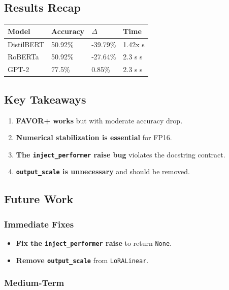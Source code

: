\subsection{Results Recap}

\begin{table}[H]
\centering
\small
\begin{tabular}{llll}
\toprule
\textbf{Model} & \textbf{Accuracy} & \textbf{$\Delta$} & \textbf{Time} \\
\midrule
DistilBERT & 50.92\% & -39.79\% & 1.42x s \\
RoBERTa & 50.92\% & -27.64\% & 2.3 s s \\
GPT-2 & 77.5\% & 0.85\% & 2.3 s s \\
\bottomrule
\end{tabular}
\end{table}

\subsection{Key Takeaways}

\begin{enumerate}
\item \textbf{FAVOR+ works} but with moderate accuracy drop.
\item \textbf{Numerical stabilization is essential} for FP16.
\item \textbf{The \texttt{inject\_performer} raise bug} violates the docstring contract.
\item \textbf{\texttt{output\_scale} is unnecessary} and should be removed.

\end{enumerate}
\subsection{Future Work}

\subsubsection{Immediate Fixes}

\begin{itemize}
\item \textbf{Fix the \texttt{inject\_performer} raise} to return \texttt{None}.
\item \textbf{Remove \texttt{output\_scale}} from \texttt{LoRALinear}.

\end{itemize}
\subsubsection{Medium-Term}


